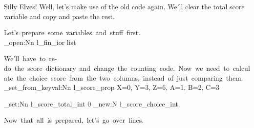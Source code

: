 \documentclass[]{article}
\begin{document}
        Silly Elves! Well, let's make use of the old code again. We'll clear the total score variable and copy and paste the rest.

        \ExplSyntaxOn

        Let's~prepare~some~variables~and~stuff~first.\newline\\

          \ior_open:Nn \l_fin_ior {list}

          We'll~have~to~re-do~the~score~dictionary~and~change~the~counting~code.~Now~we~need~to~calculate~the~choice~score~from~the~two~columns,~instead~of~just~comparing~them.\newline\\
          \prop_set_from_keyval:Nn \l_score_prop
          {
            X=0,
            Y=3,
            Z=6,
            A=1,
            B=2,
            C=3
          }

          \int_set:Nn \l_score_total_int {0}
          \int_new:N \l_score_choice_int

        Now~that~all~is~prepared,~let's~go~over~lines.\newline\\
\end{document}

